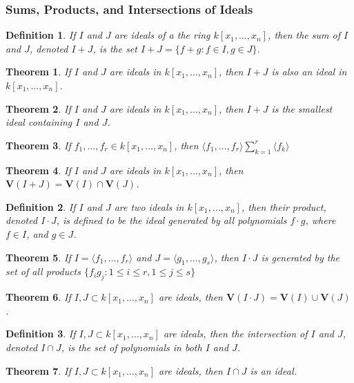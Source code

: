 \documentclass[oneside]{book}
\theoremstyle{mystyle}
\newtheorem{theorem}{Theorem}[section]
\newtheorem{definition}{Definition}[section]
\begin{document}
\subsubsection{Sums, Products, and Intersections of Ideals}
\begin{definition}
If $I$ and $J$ are ideals of a the ring $k[x_1,\hdots ,x_n]$, then the sum of $I$ and $J$, denoted $I+J$, is the set $I+J = \{f+g: f\in I, g\in J\}$.
\end{definition}
\begin{theorem}
If $I$ and $J$ are ideals in $k[x_1,\hdots ,x_n]$, then $I+J$ is also an ideal in $k[x_1,\hdots ,x_n]$.
\end{theorem}
\begin{theorem}
If $I$ and $J$ are ideals in $k[x_1,\hdots ,x_n]$, then $I+J$ is the smallest ideal containing $I$ and $J$.
\end{theorem}
\begin{theorem}
If $f_1,\hdots, f_r \in k[x_1,\hdots ,x_n]$, then $\langle f_1,\hdots, f_r\rangle \sum_{k=1}^{r} \langle f_k\rangle$
\end{theorem}
\begin{theorem}
If $I$ and $J$ are ideals in $k[x_1,\hdots ,x_n]$, then $\mathbf{V}(I+J) = \mathbf{V}(I) \cap \mathbf{V}(J)$.
\end{theorem}
\begin{definition}
If $I$ and $J$ are two ideals in $k[x_1,\hdots ,x_n]$, then their product, denoted $I\cdot J$, is defined to be the ideal generated by all polynomials $f\cdot g$, where $f\in I$, and $g\in J$.
\end{definition}
\begin{theorem}
If $I = \langle f_1,\hdots, f_r\rangle$ and $J = \langle g_1,\hdots, g_s\rangle$, then $I \cdot J$ is generated by the set of all products $\{f_ig_j:1\leq i\leq r, 1\leq j \leq s\}$
\end{theorem}
\begin{theorem}
If $I,J\subset k[x_1,\hdots ,x_n]$ are ideals, then $\mathbf{V}(I\cdot J) = \mathbf{V}(I)\cup \mathbf{V}(J)$.
\end{theorem}
\begin{definition}
If $I,J\subset k[x_1,\hdots ,x_n]$ are ideals, then the intersection of $I$ and $J$, denoted $I\cap J$, is the set of polynomials in both $I$ and $J$.
\end{definition}
\begin{theorem}
If $I,J\subset k[x_1,\hdots ,x_n]$ are ideals, then $I\cap J$ is an ideal.
\end{theorem}
\end{document}
